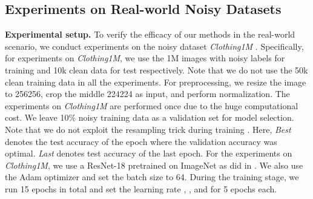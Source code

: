 \documentclass[11pt]{article}
\begin{document}
\vspace{-10pt}
\subsection{Experiments on Real-world Noisy Datasets}\label{sec:3.3}
\textbf{Experimental setup.} To verify the efficacy of our methods in the real-world scenario, we conduct experiments on the noisy dataset \textit{Clothing1M} \citep{xiao2015learning}. Specifically, for experiments on \textit{Clothing1M}, we use the 1M images with noisy labels for training and 10k clean data for test respectively. Note that we do not use the 50k clean training data in all the experiments. For preprocessing, we resize the image to 256256, crop the middle 224224 as input, and perform normalization. The experiments on \textit{Clothing1M} are performed once due to the huge computational cost.  We leave 10\% noisy training data as a validation set for model selection. Note that we do not exploit the resampling trick during training \citep{li2020dividemix}. Here, \textit{Best} denotes the test accuracy of the epoch where the validation accuracy was optimal. \textit{Last} denotes test accuracy of the last epoch. For the experiments on \textit{Clothing1M}, we use a ResNet-18 pretrained on ImageNet as did in \citep{wei2020combating}. We also use the Adam optimizer and set the batch size to 64. During the training stage, we run 15 epochs in total and set the learning rate , , and  for 5 epochs each.
\end{document}
